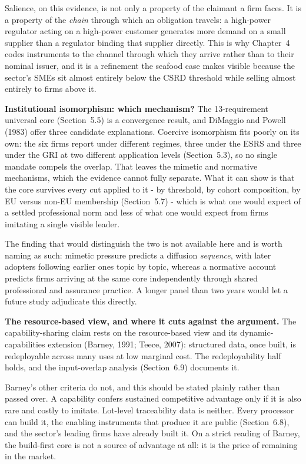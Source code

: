 \documentclass[
]{article}
\begin{document}
Salience, on this evidence, is not only a property of the claimant a firm faces.
It is a property of the \emph{chain} through which an obligation travels: a
high-power regulator acting on a high-power customer generates more demand on a
small supplier than a regulator binding that supplier directly. This is why
Chapter~4 codes instruments to the channel through which they arrive rather than
to their nominal issuer, and it is a refinement the seafood case makes visible
because the sector's SMEs sit almost entirely below the CSRD threshold while
selling almost entirely to firms above it.

\textbf{Institutional isomorphism: which mechanism?} The 13-requirement universal
core (Section~5.5) is a convergence result, and DiMaggio and Powell (1983) offer
three candidate explanations. Coercive isomorphism fits poorly on its own: the six
firms report under different regimes, three under the ESRS and three under the GRI
at two different application levels (Section~5.3), so no single mandate compels the
overlap. That leaves the mimetic and normative mechanisms, which the evidence
cannot fully separate. What it can show is that the core survives every cut applied
to it - by threshold, by cohort composition, by EU versus non-EU membership
(Section~5.7) - which is what one would expect of a settled professional norm and
less of what one would expect from firms imitating a single visible leader.

The finding that would distinguish the two is not available here and is worth
naming as such: mimetic pressure predicts a diffusion \emph{sequence}, with later
adopters following earlier ones topic by topic, whereas a normative account
predicts firms arriving at the same core independently through shared professional
and assurance practice. A longer panel than two years would let a future study
adjudicate this directly.

\textbf{The resource-based view, and where it cuts against the argument.} The
capability-sharing claim rests on the resource-based view and its
dynamic-capabilities extension (Barney, 1991; Teece, 2007): structured data, once
built, is redeployable across many uses at low marginal cost. The redeployability
half holds, and the input-overlap analysis (Section~6.9) documents it.

Barney's other criteria do not, and this should be stated plainly rather than
passed over. A capability confers sustained competitive advantage only if it is
also rare and costly to imitate. Lot-level traceability data is neither. Every
processor can build it, the enabling instruments that produce it are public
(Section~6.8), and the sector's leading firms have already built it. On a strict
reading of Barney, the build-first core is not a source of advantage at all: it is
the price of remaining in the market.
\end{document}

